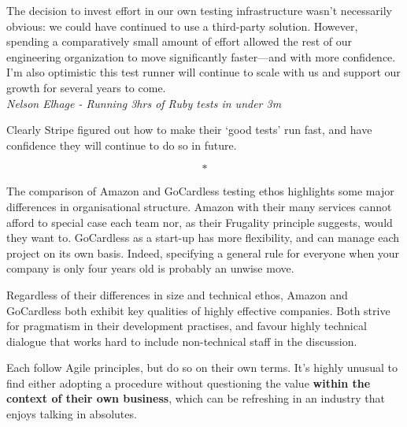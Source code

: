 \documentclass[11pt]{article}
\begin{document}
\begin{displayquote}

  The decision to invest effort in our own testing infrastructure wasn't
  necessarily obvious: we could have continued to use a third-party solution.
  However, spending a comparatively small amount of effort allowed the rest of our
  engineering organization to move significantly faster—and with more confidence.
  I'm also optimistic this test runner will continue to scale with us and support
  our growth for several years to come.\\

  \textit{Nelson Elhage - Running 3hrs of Ruby tests in under
  3m~\cite{stripeDistributedTesting}}

\end{displayquote}

Clearly Stripe figured out how to make their `good tests' run fast, and have
confidence they will continue to do so in future.

\[*\]

The comparison of Amazon and GoCardless testing ethos highlights some major
differences in organisational structure. Amazon with their many services cannot
afford to special case each team nor, as their Frugality principle suggests,
would they want to. GoCardless as a start-up has more flexibility, and can
manage each project on its own basis. Indeed, specifying a general rule for
everyone when your company is only four years old is probably an unwise move.

Regardless of their differences in size and technical ethos, Amazon and
GoCardless both exhibit key qualities of highly effective companies. Both strive
for pragmatism in their development practises, and favour highly technical
dialogue that works hard to include non-technical staff in the discussion.

Each follow Agile principles, but do so on their own terms. It's highly unusual
to find either adopting a procedure without questioning the value \textbf{within
the context of their own business}, which can be refreshing in an industry that
enjoys talking in absolutes.


\medskip
{}

\newpage
\end{document}

